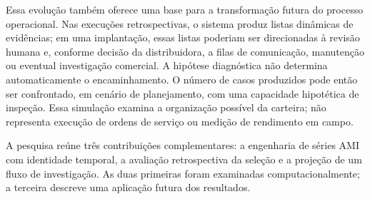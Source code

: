 Essa evolução também oferece uma base para a transformação futura do processo operacional. Nas execuções retrospectivas, o sistema produz listas dinâmicas de evidências; em uma implantação, essas listas poderiam ser direcionadas à revisão humana e, conforme decisão da distribuidora, a filas de comunicação, manutenção ou eventual investigação comercial. A hipótese diagnóstica não determina automaticamente o encaminhamento. O número de casos produzidos pode então ser confrontado, em cenário de planejamento, com uma capacidade hipotética de inspeção. Essa simulação examina a organização possível da carteira; não representa execução de ordens de serviço ou medição de rendimento em campo.

A pesquisa reúne três contribuições complementares: a engenharia de séries AMI com identidade temporal, a avaliação retrospectiva da seleção e a projeção de um fluxo de investigação. As duas primeiras foram examinadas computacionalmente; a terceira descreve uma aplicação futura dos resultados.



